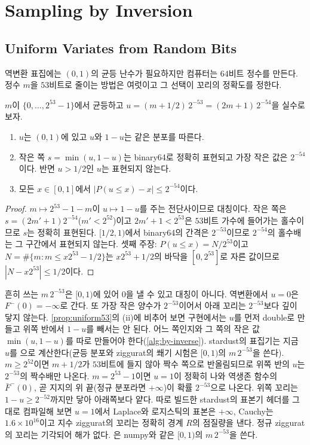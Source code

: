 \section{Sampling by Inversion}
\label{sec:inversion}

\subsection{Uniform Variates from Random Bits}

역변환 표집에는 $(0,1)$의 균등 난수가 필요하지만 컴퓨터는 $64$비트 정수를 만든다. 정수 $m$을 $53$비트로 줄이는 방법은 여럿이고 그 선택이 꼬리의 정확도를 정한다.

\begin{proposition}
\label{prop:uniform53}
$m$이 $\{0,\dots,2^{53}-1\}$에서 균등하고 $u=(m+1/2)\,2^{-53}=(2m+1)\,2^{-54}$을 실수로 보자.
\begin{enumerate}
\item $u$는 $(0,1)$에 있고 $u$와 $1-u$는 같은 분포를 따른다.
\item 작은 쪽 $s=\min(u,1-u)$는 binary64로 정확히 표현되고 가장 작은 값은 $2^{-54}$이다. 반면 $u>1/2$인 $u$는 표현되지 않는다.
\item 모든 $x\in[0,1]$에서 $|P(u\le x)-x|\le2^{-54}$이다.
\end{enumerate}
\end{proposition}

\begin{proof}
$m\mapsto2^{53}-1-m$이 $u\mapsto1-u$를 주는 전단사이므로 대칭이다. 작은 쪽은 $s=(2m'+1)2^{-54}$($m'<2^{52}$)이고 $2m'+1<2^{53}$은 $53$비트 가수에 들어가는 홀수이므로 $s$는 정확히 표현된다. $[1/2,1)$에서 binary64의 간격은 $2^{-53}$이므로 $2^{-54}$의 홀수배는 그 구간에서 표현되지 않는다. 셋째 주장: $P(u\le x)=N/2^{53}$이고 $N=\#\{m:m\le x2^{53}-1/2\}$는 $x2^{53}+1/2$의 바닥을 $[0,2^{53}]$로 자른 값이므로 $|N-x2^{53}|\le1/2$이다.
\end{proof}

흔히 쓰는 $m\,2^{-53}$은 $[0,1)$에 있어 $0$을 낼 수 있고 대칭이 아니다. 역변환에서 $u=0$은 $F^{-}(0)=-\infty$로 간다. 또 가장 작은 양수가 $2^{-53}$이어서 아래 꼬리는 $2^{-53}$보다 깊이 닿지 않는다. \cref{prop:uniform53}의 (ii)에 비추어 보면 구현에서는 $u$를 먼저 double로 만들고 위쪽 반에서 $1-u$를 빼서는 안 된다. 어느 쪽인지와 그 쪽의 작은 값 $\min(u,1-u)$를 따로 만들어야 한다(\cref{alg:by-inverse}). stardust의 표집기는 지금 $u$를 으로 계산한다(균등 분포와 ziggurat의 쐐기 시험은 $[0,1)$의 $m\,2^{-53}$을 쓴다). $m\ge2^{52}$이면 $m+1/2$가 $53$비트에 들지 않아 짝수 쪽으로 반올림되므로 위쪽 반의 $u$는 $2^{-53}$의 짝수배만 나온다. $m=2^{53}-1$이면 $u=1$이 정확히 나와 역생존 함수의 $\bar F^{-}(0)$, 곧 지지의 위 끝(정규 분포라면 $+\infty$)이 확률 $2^{-53}$으로 나온다. 위쪽 꼬리는 $1-u\ge2^{-52}$까지만 닿아 아래쪽보다 얕다. 따로 빌드한 stardust의 표본기 헤더를 그대로 컴파일해 보면 $u=1$에서 Laplace와 로지스틱의 표본은 $+\infty$, Cauchy는 $1.6\times10^{16}$이고 지수 ziggurat의 꼬리는 정확히 경계 $R$의 점질량을 낸다. 정규 ziggurat의 꼬리는 기각되어 해가 없다. 은 numpy와 같은 $[0,1)$의 $m\,2^{-53}$을 쓴다.

